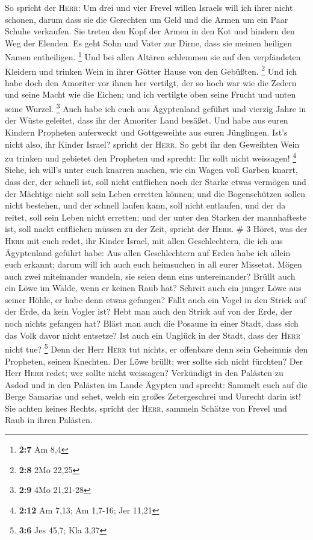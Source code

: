  So spricht der \textsc{Herr}: Um drei und vier Frevel
willen Israels will ich ihrer nicht schonen, darum dass sie die
Gerechten um Geld und die Armen um ein Paar Schuhe verkaufen.
 Sie treten den Kopf der Armen in den Kot und hindern den
Weg der Elenden. Es geht Sohn und Vater zur Dirne, dass sie meinen
heiligen Namen entheiligen. \footnote{\textbf{2:7} Am 8,4}
 Und bei allen Altären schlemmen sie auf den verpfändeten
Kleidern und trinken Wein in ihrer Götter Hause von den Gebüßten.
\footnote{\textbf{2:8} 2Mo 22,25}  Und ich habe doch den
Amoriter vor ihnen her vertilgt, der so hoch war wie die Zedern und
seine Macht wie die Eichen; und ich vertilgte oben seine Frucht und
unten seine Wurzel. \footnote{\textbf{2:9} 4Mo 21,21-28} 
Auch habe ich euch aus Ägyptenland geführt und vierzig Jahre in der
Wüste geleitet, dass ihr der Amoriter Land besäßet.  Und
habe aus euren Kindern Propheten auferweckt und Gottgeweihte aus euren
Jünglingen. Ist's nicht also, ihr Kinder Israel? spricht der
\textsc{Herr}.  So gebt ihr den Geweihten Wein zu trinken
und gebietet den Propheten und sprecht: Ihr sollt nicht weissagen!
\footnote{\textbf{2:12} Am 7,13; Am 1,7-16; Jer 11,21} 
Siehe, ich will's unter euch knarren machen, wie ein Wagen voll Garben
knarrt,  dass der, der schnell ist, soll nicht entfliehen
noch der Starke etwas vermögen und der Mächtige nicht soll sein Leben
erretten können;  und die Bogenschützen sollen nicht
bestehen, und der schnell laufen kann, soll nicht entlaufen, und der da
reitet, soll sein Leben nicht erretten;  und der unter
den Starken der mannhafteste ist, soll nackt entfliehen müssen zu der
Zeit, spricht der \textsc{Herr}. \# 3  Höret, was der
\textsc{Herr} mit euch redet, ihr Kinder Israel, mit allen
Geschlechtern, die ich aus Ägyptenland geführt habe:  Aus
allen Geschlechtern auf Erden habe ich allein euch erkannt; darum will
ich auch euch heimsuchen in all eurer Missetat.  Mögen
auch zwei miteinander wandeln, sie seien denn eins untereinander?
 Brüllt auch ein Löwe im Walde, wenn er keinen Raub hat?
Schreit auch ein junger Löwe aus seiner Höhle, er habe denn etwas
gefangen?  Fällt auch ein Vogel in den Strick auf der
Erde, da kein Vogler ist? Hebt man auch den Strick auf von der Erde, der
noch nichts gefangen hat?  Bläst man auch die Posaune in
einer Stadt, dass sich das Volk davor nicht entsetze? Ist auch ein
Unglück in der Stadt, dass der \textsc{Herr} nicht tue? \footnote{\textbf{3:6}
  Jes 45,7; Kla 3,37}  Denn der Herr \textsc{Herr} tut
nichts, er offenbare denn sein Geheimnis den Propheten, seinen Knechten.
 Der Löwe brüllt; wer sollte sich nicht fürchten? Der Herr
\textsc{Herr} redet; wer sollte nicht weissagen? 
Verkündigt in den Palästen zu Asdod und in den Palästen im Lande Ägypten
und sprecht: Sammelt euch auf die Berge Samarias und sehet, welch ein
großes Zetergeschrei und Unrecht darin ist!  Sie achten
keines Rechts, spricht der \textsc{Herr}, sammeln Schätze von Frevel und
Raub in ihren Palästen.

